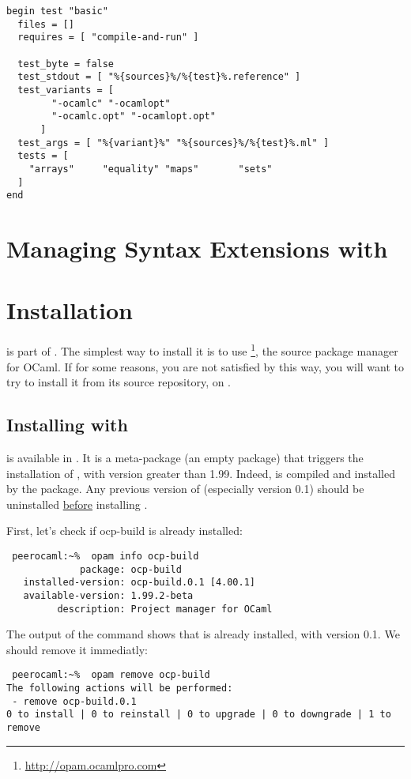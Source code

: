\begin{verbatim}
begin test "basic"
  files = []
  requires = [ "compile-and-run" ]

  test_byte = false
  test_stdout = [ "%{sources}%/%{test}%.reference" ]
  test_variants = [
        "-ocamlc" "-ocamlopt"
        "-ocamlc.opt" "-ocamlopt.opt"
      ]
  test_args = [ "%{variant}%" "%{sources}%/%{test}%.ml" ]
  tests = [
    "arrays"     "equality"	"maps"       "sets"
  ]
end
\end{verbatim}

\chapter{Managing Syntax Extensions with \ocpbuild{}}

\chapter{Installation}

\ocpbuild{} is part of \typerex{}. The simplest way to install it is
to use \opam{}\footnote{\url{http://opam.ocamlpro.com}}, the source package
manager for OCaml. If for some reasons, you are not satisfied by this
way, you will want to try to install it from its source repository, on
\github{}.

\section{Installing with \opam{}}

\ocpbuild{} is available in \opam{}. It is a meta-package (an empty
package) that triggers the installation of \typerex{}, with version
greater than 1.99. Indeed, \ocpbuild{} is compiled and installed by
the \typerex{} package. Any previous version of \ocpbuild{}
(especially version 0.1) should be uninstalled \underline{before}
installing \typerex{}.

First, let's check if ocp-build is already installed:
\begin{verbatim}
 peerocaml:~%  opam info ocp-build
             package: ocp-build
   installed-version: ocp-build.0.1 [4.00.1]
   available-version: 1.99.2-beta
         description: Project manager for OCaml
\end{verbatim}

The output of the command shows that \ocpbuild{} is already installed,
with version 0.1. We should remove it immediatly:

\begin{verbatim}
 peerocaml:~%  opam remove ocp-build
The following actions will be performed:
 - remove ocp-build.0.1
0 to install | 0 to reinstall | 0 to upgrade | 0 to downgrade | 1 to remove
\end{verbatim}

